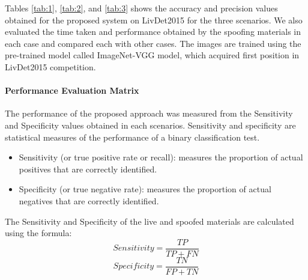 Tables \ref{tab:1},  \ref{tab:2}, and  \ref{tab:3} shows the accuracy and precision values obtained for the proposed system on LivDet2015 for the three scenarios. We also evaluated the time taken and performance obtained by the spoofing materials in each case and compared each with other cases. The images are trained using the pre-trained model called ImageNet-VGG model, which acquired first position in LivDet2015 competition. 
\textbf{}\paragraph{Performance Evaluation Matrix}
The performance of the proposed approach was measured from the Sensitivity and Specificity values obtained in each scenarios. Sensitivity and specificity are statistical measures of the performance of a binary classification test.

\begin{itemize}
\item Sensitivity (or true positive rate or recall): measures the proportion of actual positives that are correctly identified. 
\item Specificity (or true negative rate): measures the proportion of actual negatives that are correctly identified.
\end{itemize}
  
The Sensitivity and Specificity of the live and spoofed materials are calculated using the formula:
\begin{equation}
Sensitivity = \frac {TP}{TP + FN}
\end{equation}
\begin{equation}
Specificity = \frac {TN}{FP + TN}
\end{equation}

